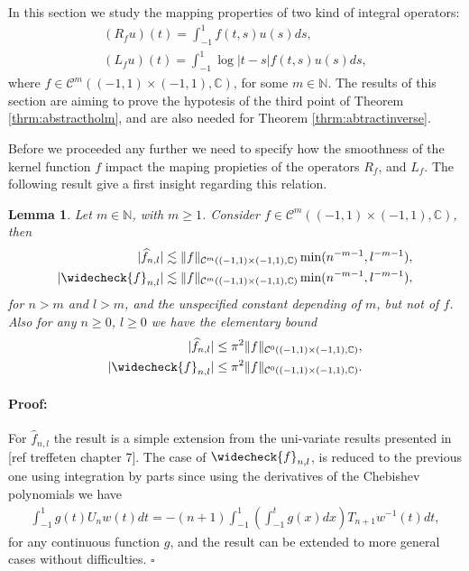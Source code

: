 \documentclass{article}
\newtheorem{lemma}[theorem]{Lemma}
\newenvironment{proof}{\paragraph{Proof:}}{\hfill$\square$}
\newcommand{\todo}[1]{{\color{red}[#1]}}
\newcommand{\IC}{{\mathbb C}}
\newcommand{\IN}{{\mathbb N}}
\newcommand{\cmspace}[3]{\mathcal{C}^{#1} \left( #2, #3 \right)}
\newcommand{\iinterv}{(-1,1)\times(-1,1)}
\begin{document}
In this section we study the mapping properties of two kind of integral operators: 
\begin{align*}
(R_f u)(t) = \int_{-1}^1f(t,s) u(s) ds,\\
(L_fu)(t) = \int_{-1}^1 \log|t-s| f(t,s) u(s) ds,
\end{align*}
where $f \in \cmspace{m}{(-1,1)\times(-1,1)}{\IC}$, for some $m \in \IN$. The results of this section are aiming to prove the hypotesis of the third point of Theorem \ref{thrm:abstractholm}, and are also needed for Theorem \ref{thrm:abtractinverse}.

Before we proceeded any further we need to specify how the smoothness of the kernel function $f$ impact the maping propieties of the operators $R_f$, and $L_f$. The following result give a first insight regarding this relation. 

\begin{lemma}
\label{lemma:cmdecay}
Let $m \in \IN$, with $m\geq 1$. Consider $f \in \cmspace{m}{\iinterv}{\IC}$, then 
\begin{align*}
|\widehat{f}_{n,l}| \lesssim \|f\|_{\cmspace{m}{\iinterv}{\IC}}  \min ( n^{-m-1}, l^{-m-1}),\\
|\widecheck{f}_{n,l}| \lesssim \|f\|_{\cmspace{m}{\iinterv}{\IC}}  \min ( n^{-m-1}, l^{-m-1}),
\end{align*}
for $n>m$ and $l>m$, and the unspecified constant depending of $m$, but not of $f$. Also for any $n \geq 0$, $l \geq 0$ we have the elementary bound 
\begin{align*} |\widehat{f}_{n,l}| \leq \pi^2 \|f\|_{\cmspace{0}{\iinterv}{\IC}}, \\ 
 |\widecheck{f}_{n,l}| \leq \pi^2 \|f\|_{\cmspace{0}{\iinterv}{\IC}}.
\end{align*}
\end{lemma}
\begin{proof}
For $\widehat{f}_{n,l}$ the result is a simple extension from the uni-variate results presented in \todo{ref treffeten chapter 7}. The case of $\widecheck{f}_{n,l}$, is reduced to the previous one using integration by parts since using the derivatives of the Chebishev polynomials we have
\begin{align*}
\int_{-1}^1 g(t) U_n w(t) dt  = - (n+1) \int_{-1}^1 \left( \int_{-1}^t g(x) dx\right) T_{n+1} w^{-1}(t) dt,
\end{align*}
for any continuous function $g$, and the result can be extended to more general cases without difficulties.  
\end{proof}
\end{document}
